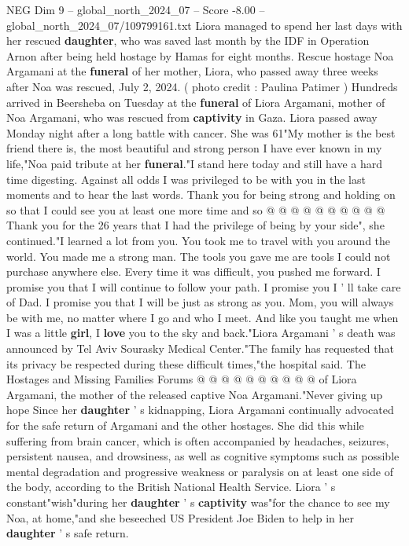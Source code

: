 \begin{textsample}{NEG Dim 9 – global\_north\_2024\_07 – Score -8.00 – global\_north\_2024\_07/109799161.txt}  \label{ex:f9_neg_154}
Liora managed to spend her last days with her rescued \textbf{daughter}, who was saved last month by the IDF in Operation Arnon after being held hostage by Hamas for eight months.
Rescue hostage Noa Argamani at the \textbf{funeral} of her mother, Liora, who passed away three weeks after Noa was rescued, July 2, 2024. ( photo credit : Paulina Patimer ) Hundreds arrived in Beersheba on Tuesday at the \textbf{funeral} of Liora Argamani, mother of Noa Argamani, who was rescued from \textbf{captivity} in Gaza.
Liora passed away Monday night after a long battle with cancer.
She was 61"My mother is the best friend there is, the most beautiful and strong person I have ever known in my life,"Noa paid tribute at her \textbf{funeral}."I stand here today and still have a hard time digesting.
Against all odds I was privileged to be with you in the last moments and to hear the last words.
Thank you for being strong and holding on so that I could see you at least one more time and so @ @ @ @ @ @ @ @ @ @ Thank you for the 26 years that I had the privilege of being by your side", she continued."I learned a lot from you.
You took me to travel with you around the world.
You made me a strong man.
The tools you gave me are tools I could not purchase anywhere else.
Every time it was difficult, you pushed me forward.
I promise you that I will continue to follow your path.
I promise you I ' ll take care of Dad.
I promise you that I will be just as strong as you.
Mom, you will always be with me, no matter where I go and who I meet.
And like you taught me when I was a little \textbf{girl}, I \textbf{love} you to the sky and back."Liora Argamani ' s death was announced by Tel Aviv Sourasky Medical Center."The family has requested that its privacy be respected during these difficult times,"the hospital said.
The Hostages and Missing Families Forums @ @ @ @ @ @ @ @ @ @ of Liora Argamani, the mother of the released captive Noa Argamani."Never giving up hope Since her \textbf{daughter} ' s kidnapping, Liora Argamani continually advocated for the safe return of Argamani and the other hostages.
She did this while suffering from brain cancer, which is often accompanied by headaches, seizures, persistent nausea, and drowsiness, as well as cognitive symptoms such as possible mental degradation and progressive weakness or paralysis on at least one side of the body, according to the British National Health Service.
Liora ' s constant"wish"during her \textbf{daughter} ' s \textbf{captivity} was"for the chance to see my Noa, at home,"and she beseeched US President Joe Biden to help in her \textbf{daughter} ' s safe return.

\end{textsample}
